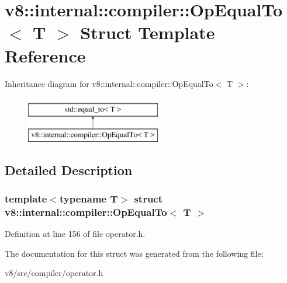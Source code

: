 \hypertarget{structv8_1_1internal_1_1compiler_1_1OpEqualTo}{}\section{v8\+:\+:internal\+:\+:compiler\+:\+:Op\+Equal\+To$<$ T $>$ Struct Template Reference}
\label{structv8_1_1internal_1_1compiler_1_1OpEqualTo}
Inheritance diagram for v8\+:\+:internal\+:\+:compiler\+:\+:Op\+Equal\+To$<$ T $>$\+:\begin{figure}[H]
\begin{center}
\leavevmode
\includegraphics[height=2.000000cm]{structv8_1_1internal_1_1compiler_1_1OpEqualTo}
\end{center}
\end{figure}


\subsection{Detailed Description}
\subsubsection*{template$<$typename T$>$\newline
struct v8\+::internal\+::compiler\+::\+Op\+Equal\+To$<$ T $>$}



Definition at line 156 of file operator.\+h.



The documentation for this struct was generated from the following file\+:\begin{DoxyCompactItemize}
\item 
v8/src/compiler/operator.\+h\end{DoxyCompactItemize}

